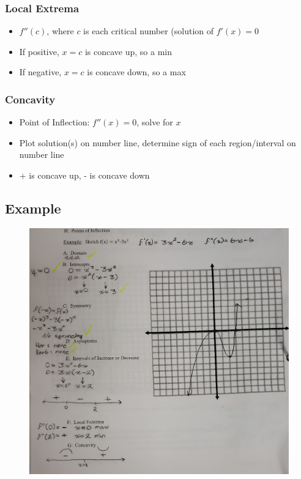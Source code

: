 \documentclass[a4paper,12pt]{article}
\begin{document}
\subsubsection{Local Extrema}
\begin{itemize}
    \item{$f''(c)$, where $c$ is each critical number (solution of $f'(x) = 0$}
    \item{If positive, $x=c$ is concave up, so a min}
    \item{If negative, $x=c$ is concave down, so a max}
\end{itemize}

\subsubsection{Concavity}
\begin{itemize}
    \item{Point of Inflection: $f''(x) = 0$, solve for $x$}
    \item{Plot solution(s) on number line, determine sign of each region/interval on number line}
    \item{+ is concave up, - is concave down}
\end{itemize}

\subsection{Example}
\begin{figure}[H]
    \centering
    \includegraphics[width=\textwidth]{eg}
\end{figure}
\end{document}
